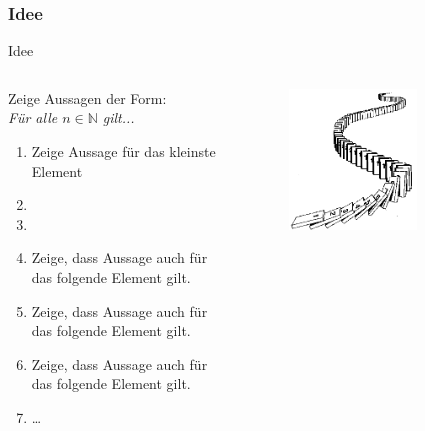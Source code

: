 \subsubsection{Idee}
\begin{frame}[fragile]{Idee}
\begin{columns}
    \begin{alertblock}{Zeige Aussagen der Form:\\\emph{Für alle $n\in\mathbb{N}$ gilt...}}
    \begin{enumerate}
        \item Zeige Aussage für das kleinste Element
        \item<1-> 
        \item<2-6,8> 
        \item<3-6> \footnotesize Zeige, dass Aussage auch für das folgende Element gilt.
        \item<4-6> \scriptsize Zeige, dass Aussage auch für das folgende Element gilt.
        \item<5-6> \tiny Zeige, dass Aussage auch für das folgende Element gilt.
        \item<6> \dots
    \end{enumerate}
    \end{alertblock}
    \begin{figure}
        \centering
        \includegraphics[width=0.7\textwidth]{../figures/induction.jpg}
    \end{figure}
\end{columns}
\end{frame}

